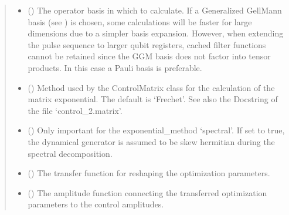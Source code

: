 \documentclass[letterpaper,10pt,english]{sphinxmanual}
\begin{document}
\begin{fulllineitems}
\begin{quote}
\begin{description}
\begin{itemize}
\item {} 
 (\sphinxstyleliteralemphasis{\sphinxupquote{, }}\sphinxstyleliteralemphasis{\sphinxupquote{ (}}\sphinxstyleliteralemphasis{\sphinxupquote{, }}\sphinxstyleliteralemphasis{\sphinxupquote{, }}\sphinxstyleliteralemphasis{\sphinxupquote{)}}\sphinxstyleliteralemphasis{\sphinxupquote{, }}) \textendash{} The operator basis in which to calculate. If a Generalized Gell\sphinxhyphen{}Mann
basis (see ) is chosen, some calculations will
be faster for large dimensions due to a simpler basis expansion.
However, when extending the pulse sequence to larger qubit registers,
cached filter functions cannot be retained since the GGM basis does not
factor into tensor products. In this case a Pauli basis is preferable.

\item {} 
 (\sphinxstyleliteralemphasis{\sphinxupquote{, }}) \textendash{} Method used by the ControlMatrix class for the calculation of the
matrix exponential. The default is ‘Frechet’. See also the Docstring of
the file ‘control\_2.matrix’.

\item {} 
 () \textendash{} Only important for the exponential\_method ‘spectral’. If set to true,
the dynamical generator is assumed to be skew hermitian during the
spectral decomposition.

\item {} 
 ({\hyperref[\detokenize{qsim:qsim.transfer_function.TransferFunction}]{}}) \textendash{} The transfer function for reshaping the optimization parameters.

\item {} 
 ({\hyperref[\detokenize{qsim:qsim.amplitude_functions.AmplitudeFunction}]{}}) \textendash{} The amplitude function connecting the transferred optimization
parameters to the control amplitudes.


\end{itemize}
\end{description}
\end{quote}
\end{fulllineitems}
\end{document}
